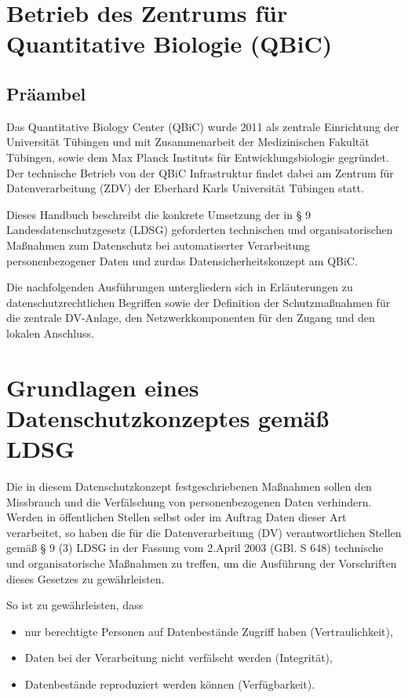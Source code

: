 \documentclass[]{scrreprt}
\begin{document}
\tableofcontents{}

\chapter*{Betrieb des Zentrums für Quantitative Biologie (QBiC)}
%
\section*{Präambel}
%
Das Quantitative Biology Center (QBiC) wurde 2011 als zentrale Einrichtung der Universität Tübingen und mit Zusammenarbeit der Medizinischen Fakultät Tübingen, sowie dem Max Planck Instituts für Entwicklungsbiologie gegründet. Der technische Betrieb von der QBiC Infrastruktur findet dabei am Zentrum für Datenverarbeitung (ZDV) der Eberhard Karls Universität Tübingen statt.

Dieses Handbuch beschreibt die konkrete Umsetzung der in § 9 Landesdatenschutzgesetz (LDSG) geforderten technischen und organisatorischen Maßnahmen zum Datenschutz bei automatiserter Verarbeitung personenbezogener Daten und zurdas  Datensicherheitskonzept am QBiC.

Die nachfolgenden Ausführungen untergliedern sich in Erläuterungen zu datenschutzrechtlichen Begriffen sowie der Definition der Schutzmaßnahmen für die zentrale DV-Anlage, den Netzwerkkomponenten für den Zugang und den lokalen Anschluss. 


\chapter{Grundlagen eines Datenschutzkonzeptes gemäß LDSG}
Die in diesem Datenschutzkonzept festgeschriebenen Maßnahmen sollen den Missbrauch und die Verfälschung von  personenbezogenen Daten verhindern. Werden in öffentlichen Stellen selbst oder im Auftrag Daten dieser Art verarbeitet, so haben die für die Datenverarbeitung (DV) verantwortlichen Stellen gemäß § 9 (3) LDSG in der Fassung vom 2.April 2003 (GBl. S 648)  technische und organisatorische Maßnahmen zu treffen, um die Ausführung der Vorschriften dieses Gesetzes zu gewährleisten.

\noindent
So ist zu gewährleisten, dass
\begin{itemize}
	\item nur berechtigte Personen auf Datenbestände Zugriff haben (Vertraulichkeit),
	\item Daten bei der Verarbeitung nicht verfälscht werden (Integrität),
	\item Datenbestände reproduziert werden können (Verfügbarkeit).
\end{itemize}
\end{document}

